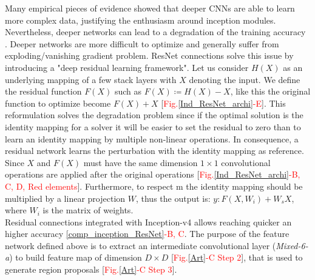 \documentclass[12pt, french, a4paper]{article} %
\begin{document}
Many empirical pieces of evidence showed that deeper \gls{CNN}s are able to learn more complex data, justifying the enthusiasm around inception modules. Nevertheless, deeper networks can lead to a degradation of the training accuracy \cite{he2016deep}. Deeper networks are more difficult to optimize and generally suffer from exploding/vanishing gradient problem. ResNet \cite{he2016deep} connections solve this issue by introducing a "deep residual learning framework". Let us consider $H(X)$ as an underlying mapping of a few stack layers with $X$ denoting the input. We define the residual function $F(X)$ such as $F(X)\coloneqq H(X) - X$, like this the original function to optimize become $F(X) + X$ [\textcolor{red}{Fig.}\ref{Ind_ResNet_archi}\textcolor{red}{-E}]. This reformulation solves the degradation problem since if the optimal solution is the identity mapping for a solver it will be easier to set the residual to zero than to learn an identity mapping by multiple non-linear operations. In consequence, a residual network learns the perturbation with the identity mapping as reference. Since $X$ and $F(X)$ must have the same dimension $1\times 1$ convolutional operations are applied after the original operations [\textcolor{red}{Fig.}\ref{Ind_ResNet_archi}\textcolor{red}{-B, C, D, Red elements}]. Furthermore, to respect m the identity mapping should be multiplied by a linear projection $W$, thus the output is: $y : F(X, {W_i}) + W_s X$, where $W_i$ is the matrix of weights.\\
Residual connections integrated with Inception-v4 allows reaching quicker an higher accuracy \ref{comp_inception_ResNet}\textcolor{red}{-B, C}. The purpose of the feature network defined above is to extract an intermediate convolutional layer (\textit{Mixed-6-a}) to build feature map of dimension $D \times D$ [\textcolor{red}{Fig.}\ref{Art}\textcolor{red}{-C Step 2}], that is used to generate region proposals [\textcolor{red}{Fig.}\ref{Art}\textcolor{red}{-C Step 3}].
\end{document}
